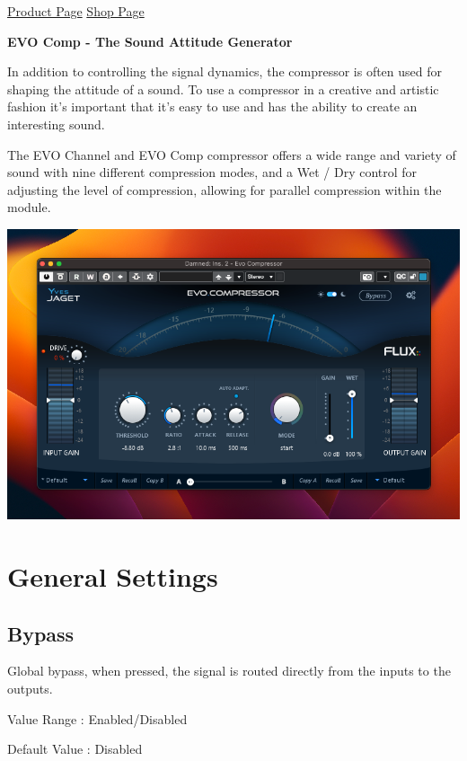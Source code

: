 \documentclass[
  letterpaper,
  DIV=11,
  numbers=noendperiod]{scrreport}
\begin{document}
\href{https://www.flux.audio/project/evo-series/}{Product Page}
\textbar{}
\href{https://shop.flux.audio/en_US/products/evo-series-pack}{Shop Page}

\textbf{EVO Comp - The Sound Attitude Generator}

In addition to controlling the signal dynamics, the compressor is often
used for shaping the attitude of a sound. To use a compressor in a
creative and artistic fashion it's important that it's easy to use and
has the ability to create an interesting sound.

The EVO Channel and EVO Comp compressor offers a wide range and variety
of sound with nine different compression modes, and a Wet / Dry control
for adjusting the level of compression, allowing for parallel
compression within the module.

\includegraphics{./include/evoComp.png}


\hypertarget{general-settings}{%
\chapter{General Settings}\label{general-settings}}

\hypertarget{bypass}{%
\section{Bypass}\label{bypass}}

Global bypass, when pressed, the signal is routed directly from the
inputs to the outputs.

Value Range : Enabled/Disabled

Default Value : Disabled
\end{document}
